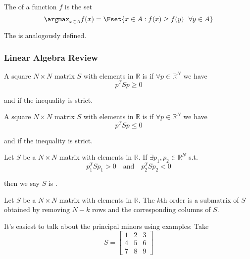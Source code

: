 \documentclass{article}
\begin{document}
\begin{definition}
  The \keyword{$\argmax$} of a function $f$ is the set
  \[
    \argmax_{x \in A} f(x) = \Fset{x \in A: f(x) \ge f(y) ~~ \forall y \in A}
  \]

  The \keyword{$\argmin$} is analogously defined.
\end{definition}

\subsubsection{Linear Algebra Review}
\label{ssub:linear_algebra_review}

\begin{definition}
  A square $N \times N$ matrix $S$ with elements in $\mathbb{R}$ is  if $\forall p \in \mathbb{R}^N$ we have
  \[
    p^T S p \ge 0
  \]

  and  if the inequality is strict.
\end{definition}

\begin{definition}
  A square $N \times N$ matrix $S$ with elements in $\mathbb{R}$ is  if $\forall p \in \mathbb{R}^N$ we have
  \[
    p^T S p \le 0
  \]

  and  if the inequality is strict.
\end{definition}

\begin{definition}
  Let $S$ be a $N \times N$ matrix with elements in $\mathbb{R}$. If $\exists p_1, p_2 \in \mathbb{R}^N$ s.t.
  \[
    p_1^T S p_1 > 0
    \quad
    \text{and}
    \quad
    p_2^T S p_2 < 0
  \]

  then we say $S$ is .
\end{definition}

\begin{definition}
  Let $S$ be a $N \times N$ matrix with elements in $\mathbb{R}$. The $k$th order  is a submatrix of $S$ obtained by removing $N - k$ rows and the corresponding columns of $S$.
\end{definition}

It's easiest to talk about the principal minors using examples: Take
\[
  S = \left[\begin{matrix}
    1 & 2 & 3 \\
    4 & 5 & 6 \\
    7 & 8 & 9
  \end{matrix}\right]
\]
\end{document}

